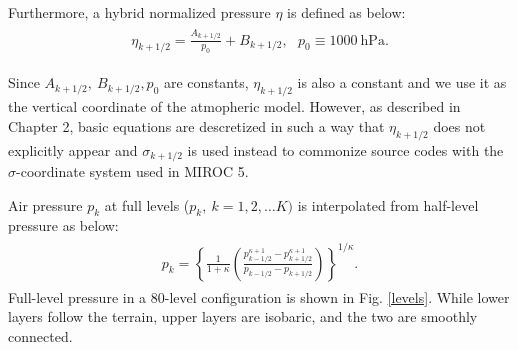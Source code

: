 Furthermore, a hybrid normalized pressure \(\eta\) is defined as below: \begin{eqnarray}\begin{aligned}
\eta_{k+1/2} = \frac{A_{k+1/2}}{p_0} +B_{k+1/2},\ \ \ p_0\equiv 1000\ \mathrm{hPa}.\end{aligned}\end{eqnarray}

Since \(A_{k+1/2},\ B_{k+1/2}, p_0\) are constants, \(\eta_{k+1/2}\) is also a constant and we use it as the vertical coordinate of the atmopheric model. However, as described in Chapter 2, basic
equations are descretized in such a way that \(\eta_{k+1/2}\) does not explicitly appear and \(\sigma_{k+1/2}\) is used instead to commonize source codes with the \(\sigma\)-coordinate system used in
MIROC 5.

Air pressure \(p_k\) at full levels (\(p_k,\ k=1,2,\ldots K)\) is interpolated from half-level pressure as below: \begin{eqnarray}\begin{aligned}
 p_k = \left\{ \frac{1}{1+\kappa}
                     \left( \frac{  p^{\kappa +1}_{k-1/2}
                                  - p^{\kappa +1}_{k+1/2}      }
                                  { p_{k-1/2} - p_{k+1/2} }
                     \right)
              \right\}^{1/\kappa}.\end{aligned}\end{eqnarray} Full-level pressure in a 80-level configuration is shown in Fig. \ref{levels}. While lower layers follow the terrain, upper layers are
isobaric, and the two are smoothly connected.

